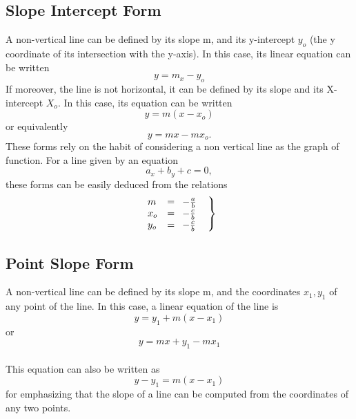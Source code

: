 \documentclass[a4paper, 12pt]{report}
\begin{document}
{          \subsection{Slope Intercept Form}
          A non-vertical line can be defined by its slope m, and its y-intercept $y_o$ (the y coordinate of its intersection with the y-axis). In this case, its linear equation can be written 
          \begin{equation}
          y = m_x - y_o
          \end{equation}
          If moreover, the line is not horizontal, it can be defined by its slope and its X-intercept $X_o$. In this case, its equation can be written
          \begin{equation}
          y = m(x - x_o)
          \end{equation}
          or equivalently
          \begin{equation}
          y = mx-mx_o.
          \end{equation}
          These forms rely on the habit of considering a non vertical line as the graph of function. For a line given by an equation
          \begin{equation}
          a_x + b_y + c = 0,
          \end{equation}
          these forms can be easily deduced from the relations\\
          \begin{equation}
          	\left.\begin{array}{lp{0.2cm}l}
          		m &=& - \frac{a}{b}\\
          		x_o &=& - \frac{c}{b}\\
          		y_o &=& - \frac{c}{b}
          	\end{array}~~\right\}
          \end{equation}
          
          \subsection{Point Slope Form}
          A non-vertical line can be defined by its slope m, and the coordinates $x_1, y_1$ of any point of the line. In this case, a linear equation of the line is
          \begin{equation}
          y = y_1 + m(x - x_1)
          \end{equation}
          or
          \begin{equation}
          y = mx + y_1 - mx_1
          \end{equation}\\
          This equation can also be written as
          \begin{equation}
          y - y_1 = m(x - x_1)
          \end{equation}
          for emphasizing that the slope of a line can be computed from the coordinates of any two points.\\
          
}
\end{document}
